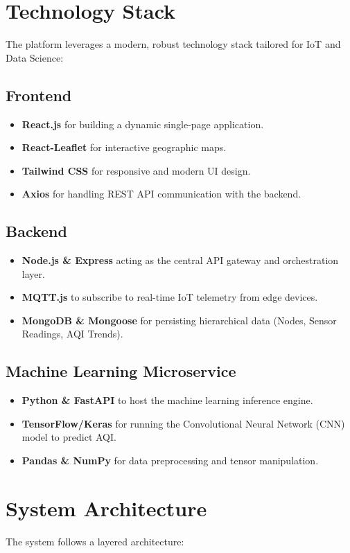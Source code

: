 \documentclass[a4paper, 12pt]{report}
\begin{document}
\section{Technology Stack}
The platform leverages a modern, robust technology stack tailored for IoT and Data Science:

\subsection{Frontend}
\begin{itemize}
\item \textbf{React.js} for building a dynamic single-page application.
\item \textbf{React-Leaflet} for interactive geographic maps.
\item \textbf{Tailwind CSS} for responsive and modern UI design.
\item \textbf{Axios} for handling REST API communication with the backend.
\end{itemize}

\subsection{Backend}
\begin{itemize}
\item \textbf{Node.js \& Express} acting as the central API gateway and orchestration layer.
\item \textbf{MQTT.js} to subscribe to real-time IoT telemetry from edge devices.
\item \textbf{MongoDB \& Mongoose} for persisting hierarchical data (Nodes, Sensor Readings, AQI Trends).
\end{itemize}

\subsection{Machine Learning Microservice}
\begin{itemize}
\item \textbf{Python \& FastAPI} to host the machine learning inference engine.
\item \textbf{TensorFlow/Keras} for running the Convolutional Neural Network (CNN) model to predict AQI.
\item \textbf{Pandas \& NumPy} for data preprocessing and tensor manipulation.
\end{itemize}

\section{System Architecture}
The system follows a layered architecture:
\end{document}
